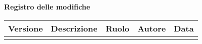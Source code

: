 \newpage

\begin{center}
	\Large{\textbf{Registro delle modifiche}}
	\\\vspace{0.5cm}
	\normalsize
	\begin{tabularx}{\textwidth}{cXccc}
		\textbf{Versione} & \textbf{Descrizione} & \textbf{Ruolo} & \textbf{Autore} & \textbf{Data} \\\toprule
		\modifiche
		\bottomrule
	\end{tabularx}
\end{center}
\newpage
